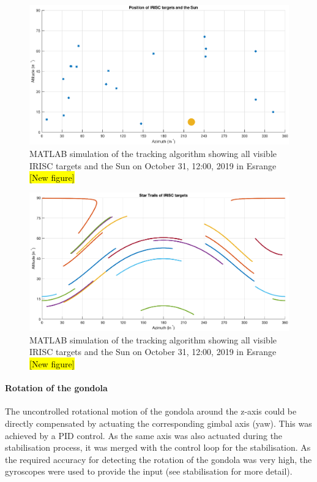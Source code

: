 \begin{figure}[htb]
	\centering
	\includegraphics[width = \textwidth]{4-experiment-design/img/software/position_map_31-10-19_12-00.eps}
	\caption{MATLAB simulation of the tracking algorithm showing all visible IRISC targets and the Sun on October 31, 12:00, 2019 in Esrange \hl{[New figure]}}
	\label{fig::software::position_map}
\end{figure}
\begin{figure}[htb]
	\centering
	\includegraphics[width = \textwidth]{4-experiment-design/img/software/star_trails_31-10-19_12-00.eps}
	\caption{MATLAB simulation of the tracking algorithm showing all visible IRISC targets and the Sun on October 31, 12:00, 2019 in Esrange \hl{[New figure]}}
	\label{fig::software::star_trails}
\end{figure}

\paragraph{Rotation of the gondola}

The uncontrolled rotational motion of the gondola around the z-axis could be directly compensated by actuating the corresponding gimbal axis (yaw). This was achieved by a PID control. As the same axis was also actuated during the stabilisation process, it was merged with the control loop for the stabilisation. As the required accuracy for detecting the rotation of the gondola was very high, the gyroscopes were used to provide the input (see stabilisation for more detail).



